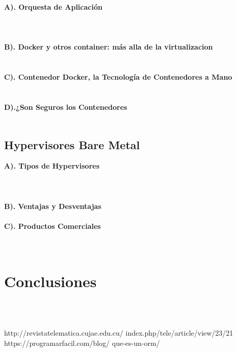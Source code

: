 \documentclass[twoside,twocolumn]{article}
\begin{document}
\begin{flushright}
\begin{itemize}
 \textbf{A). Orquesta de Aplicación }\\
\textbf{}\\
\textbf{}\\
\textbf{}\\
 \textbf{B). Docker y otros container: más alla de la virtualizacion}\\
\textbf{}\\
\textbf{}\\
 \textbf{C). Contenedor Docker, la Tecnología de Contenedores a Mano}\\
\textbf{}\\
\textbf{}\\
 \textbf{D).¿Son Seguros los Contenedores}\\
\textbf{}\\



\subsection{Hypervisores Bare Metal}

 \textbf{A). Tipos de Hypervisores }\\
\textbf{}\\
\textbf{}\\
\textbf{}\\
 \textbf{B). Ventajas y Desventajas}\\
\textbf{}\\
 \textbf{C). Productos Comerciales}\\
\textbf{}\\
\textbf{}\\



\section{Conclusiones}





\textbf{}\\
\textbf{}\\

\begin{thebibliography}{99} %

\bibitem[]{}

\newblock 
http://revistatelematica.cujae.edu.cu/
index.php/tele/article/view/23/21
\break
https://programarfacil.com/blog/
que-es-un-orm/




\newblock {\em }
 
\end{thebibliography}

\end{itemize}
\end{flushright}
\end{document}
